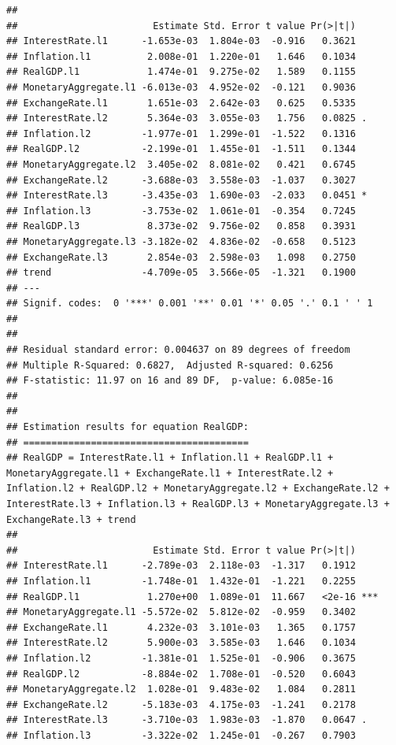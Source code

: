 \documentclass[11pt,preprint, authoryear]{elsarticle}
\numberwithin{equation}{section}
\numberwithin{figure}{section}
\numberwithin{table}{section}
\begin{document}
\begin{verbatim}
## 
##                        Estimate Std. Error t value Pr(>|t|)  
## InterestRate.l1      -1.653e-03  1.804e-03  -0.916   0.3621  
## Inflation.l1          2.008e-01  1.220e-01   1.646   0.1034  
## RealGDP.l1            1.474e-01  9.275e-02   1.589   0.1155  
## MonetaryAggregate.l1 -6.013e-03  4.952e-02  -0.121   0.9036  
## ExchangeRate.l1       1.651e-03  2.642e-03   0.625   0.5335  
## InterestRate.l2       5.364e-03  3.055e-03   1.756   0.0825 .
## Inflation.l2         -1.977e-01  1.299e-01  -1.522   0.1316  
## RealGDP.l2           -2.199e-01  1.455e-01  -1.511   0.1344  
## MonetaryAggregate.l2  3.405e-02  8.081e-02   0.421   0.6745  
## ExchangeRate.l2      -3.688e-03  3.558e-03  -1.037   0.3027  
## InterestRate.l3      -3.435e-03  1.690e-03  -2.033   0.0451 *
## Inflation.l3         -3.753e-02  1.061e-01  -0.354   0.7245  
## RealGDP.l3            8.373e-02  9.756e-02   0.858   0.3931  
## MonetaryAggregate.l3 -3.182e-02  4.836e-02  -0.658   0.5123  
## ExchangeRate.l3       2.854e-03  2.598e-03   1.098   0.2750  
## trend                -4.709e-05  3.566e-05  -1.321   0.1900  
## ---
## Signif. codes:  0 '***' 0.001 '**' 0.01 '*' 0.05 '.' 0.1 ' ' 1
## 
## 
## Residual standard error: 0.004637 on 89 degrees of freedom
## Multiple R-Squared: 0.6827,  Adjusted R-squared: 0.6256 
## F-statistic: 11.97 on 16 and 89 DF,  p-value: 6.085e-16 
## 
## 
## Estimation results for equation RealGDP: 
## ======================================== 
## RealGDP = InterestRate.l1 + Inflation.l1 + RealGDP.l1 + MonetaryAggregate.l1 + ExchangeRate.l1 + InterestRate.l2 + Inflation.l2 + RealGDP.l2 + MonetaryAggregate.l2 + ExchangeRate.l2 + InterestRate.l3 + Inflation.l3 + RealGDP.l3 + MonetaryAggregate.l3 + ExchangeRate.l3 + trend 
## 
##                        Estimate Std. Error t value Pr(>|t|)    
## InterestRate.l1      -2.789e-03  2.118e-03  -1.317   0.1912    
## Inflation.l1         -1.748e-01  1.432e-01  -1.221   0.2255    
## RealGDP.l1            1.270e+00  1.089e-01  11.667   <2e-16 ***
## MonetaryAggregate.l1 -5.572e-02  5.812e-02  -0.959   0.3402    
## ExchangeRate.l1       4.232e-03  3.101e-03   1.365   0.1757    
## InterestRate.l2       5.900e-03  3.585e-03   1.646   0.1034    
## Inflation.l2         -1.381e-01  1.525e-01  -0.906   0.3675    
## RealGDP.l2           -8.884e-02  1.708e-01  -0.520   0.6043    
## MonetaryAggregate.l2  1.028e-01  9.483e-02   1.084   0.2811    
## ExchangeRate.l2      -5.183e-03  4.175e-03  -1.241   0.2178    
## InterestRate.l3      -3.710e-03  1.983e-03  -1.870   0.0647 .  
## Inflation.l3         -3.322e-02  1.245e-01  -0.267   0.7903    

\end{verbatim}
\end{document}

